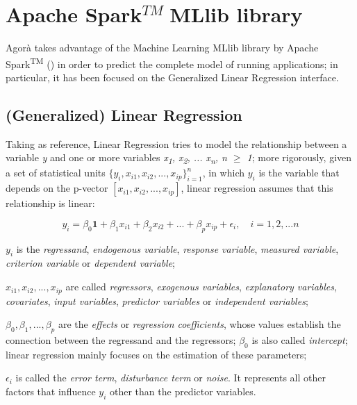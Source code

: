 \section{Apache Spark\texorpdfstring{$^{TM}\;$}MMLlib library}

Agorà takes advantage of the Machine Learning MLlib library by Apache Spark\textsuperscript{TM} (\cite{spark2015apache}) in order to predict the complete model of running applications; in particular, it has been focused on the Generalized Linear Regression interface.


\subsection{(Generalized) Linear Regression}

Taking \cite{site:caltechML2012} as reference, Linear Regression tries to model the relationship between a variable \textit{y} and one or more variables \textit{x\textsubscript{1}, x\textsubscript{2}, ... x\textsubscript{n}, n $\ge$ 1}; more rigorously, given a set of statistical units $\{y_i, x_{i1}, x_{i2}, ..., x_{ip}\}_{i = 1}^n$, in which $y_i$ is the variable that depends on the p-vector $[x_{i1}, x_{i2}, ..., x_{ip}]$, linear regression assumes that this relationship is linear:

\begin{equation}
    y_i = \beta_0\boldsymbol{1} + \beta_1x_{i1} + \beta_2x_{i2} + ... +  \beta_px_{ip} + \epsilon_i, \quad i = 1, 2, ... n
\end{equation}

$y_i$ is the \textit{regressand}, \textit{endogenous variable}, \textit{response variable}, \textit{measured variable}, \textit{criterion variable} or \textit{dependent variable};

$x_{i1}, x_{i2}, ..., x_{ip}$ are called \textit{regressors}, \textit{exogenous variables}, \textit{explanatory variables}, \textit{covariates}, \textit{input variables}, \textit{predictor variables} or \textit{independent variables};

$\beta_0, \beta_1, ..., \beta_p$ are the \textit{effects} or \textit{regression coefficients}, whose values establish the connection between the regressand and the regressors; $\beta_0$ is also called \textit{intercept}; linear regression mainly focuses on the estimation of these parameters;

$\epsilon_i$ is called the \textit{error term}, \textit{disturbance term} or \textit{noise}. It represents all other factors that influence $y_i$ other than the predictor variables.

